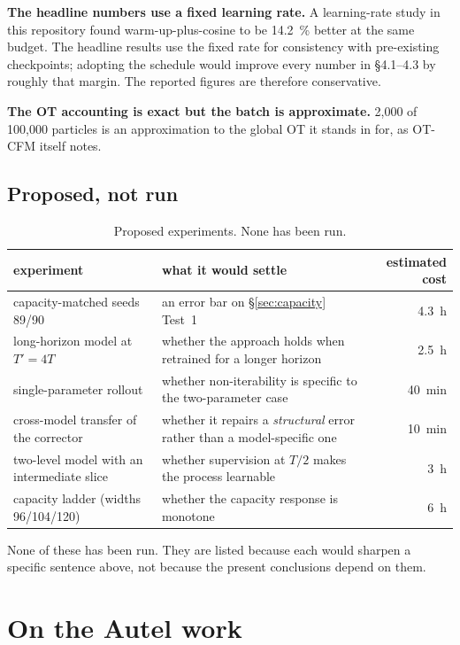 ﻿\documentclass[11pt,a4paper]{article}
\begin{document}
\textbf{The headline numbers use a fixed learning rate.} A learning-rate study in this
repository found warm-up-plus-cosine to be \SI{14.2}{\percent} better at the same budget. The
headline results use the fixed rate for consistency with pre-existing checkpoints; adopting the
schedule would improve every number in \S4.1--4.3 by roughly that margin. The reported figures
are therefore conservative.

\textbf{The OT accounting is exact but the batch is approximate.} 2{,}000 of 100{,}000 particles
is an approximation to the global OT it stands in for, as OT-CFM itself notes.

\subsection{Proposed, not run}

\begin{table}[h]
\centering\small
\begin{tabular}{@{}p{}p{}r@{}}
\toprule
experiment & what it would settle & estimated cost \\
\midrule
capacity-matched seeds 89/90 & an error bar on \S\ref{sec:capacity} Test~1 & \SI{4.3}{\hour} \\
long-horizon model at $T'=4T$ & whether the approach holds when retrained for a longer horizon
  & \SI{2.5}{\hour} \\
single-parameter rollout & whether non-iterability is specific to the two-parameter case
  & \SI{40}{\minute} \\
cross-model transfer of the corrector & whether it repairs a \emph{structural} error rather than
  a model-specific one & \SI{10}{\minute} \\
two-level model with an intermediate slice & whether supervision at $T/2$ makes the process
  learnable & \SI{3}{\hour} \\
capacity ladder (widths 96/104/120) & whether the capacity response is monotone & \SI{6}{\hour} \\
\bottomrule
\end{tabular}
\caption{Proposed experiments. None has been run.}
\end{table}

None of these has been run. They are listed because each would sharpen a specific sentence above,
not because the present conclusions depend on them.

\section{On the Autel work}
\end{document}
